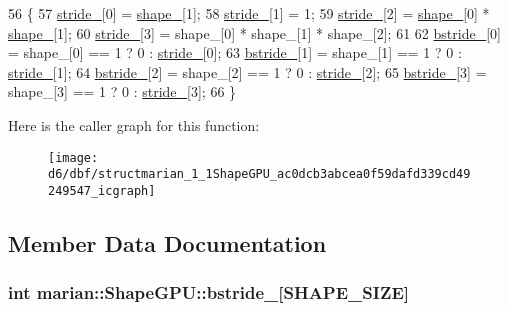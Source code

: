 \begin{DoxyCode}
56                        \{
57     \hyperlink{structmarian_1_1ShapeGPU_a1e701422755ceccd83ce44a01fce4845}{stride\_}[0] = \hyperlink{structmarian_1_1ShapeGPU_a13380b3887523932f3a300e0e3adc57b}{shape\_}[1];
58     \hyperlink{structmarian_1_1ShapeGPU_a1e701422755ceccd83ce44a01fce4845}{stride\_}[1] = 1;
59     \hyperlink{structmarian_1_1ShapeGPU_a1e701422755ceccd83ce44a01fce4845}{stride\_}[2] = \hyperlink{structmarian_1_1ShapeGPU_a13380b3887523932f3a300e0e3adc57b}{shape\_}[0] * \hyperlink{structmarian_1_1ShapeGPU_a13380b3887523932f3a300e0e3adc57b}{shape\_}[1];
60     \hyperlink{structmarian_1_1ShapeGPU_a1e701422755ceccd83ce44a01fce4845}{stride\_}[3] = shape\_[0] * shape\_[1] * shape\_[2];
61 
62     \hyperlink{structmarian_1_1ShapeGPU_a72150ef1445911f1eeeb0225395f6306}{bstride\_}[0] = shape\_[0] == 1 ? 0 : \hyperlink{structmarian_1_1ShapeGPU_a1e701422755ceccd83ce44a01fce4845}{stride\_}[0];
63     \hyperlink{structmarian_1_1ShapeGPU_a72150ef1445911f1eeeb0225395f6306}{bstride\_}[1] = shape\_[1] == 1 ? 0 : \hyperlink{structmarian_1_1ShapeGPU_a1e701422755ceccd83ce44a01fce4845}{stride\_}[1];
64     \hyperlink{structmarian_1_1ShapeGPU_a72150ef1445911f1eeeb0225395f6306}{bstride\_}[2] = shape\_[2] == 1 ? 0 : \hyperlink{structmarian_1_1ShapeGPU_a1e701422755ceccd83ce44a01fce4845}{stride\_}[2];
65     \hyperlink{structmarian_1_1ShapeGPU_a72150ef1445911f1eeeb0225395f6306}{bstride\_}[3] = shape\_[3] == 1 ? 0 : \hyperlink{structmarian_1_1ShapeGPU_a1e701422755ceccd83ce44a01fce4845}{stride\_}[3];
66   \}
\end{DoxyCode}


Here is the caller graph for this function\+:
\nopagebreak
\begin{figure}[H]
\begin{center}
\leavevmode
\texttt{[image: d6/dbf/structmarian\_1\_1ShapeGPU\_ac0dcb3abcea0f59dafd339cd49249547\_icgraph]}
\end{center}
\end{figure}




\subsection{Member Data Documentation}
\subsubsection[{\texorpdfstring{bstride\+\_\+}{bstride_}}]{\setlength{\rightskip}{0pt plus 5cm}int marian\+::\+Shape\+G\+P\+U\+::bstride\+\_\+\mbox{[}{\bf S\+H\+A\+P\+E\+\_\+\+S\+I\+ZE}\mbox{]}}\hypertarget{structmarian_1_1ShapeGPU_a72150ef1445911f1eeeb0225395f6306}{}\label{structmarian_1_1ShapeGPU_a72150ef1445911f1eeeb0225395f6306}



